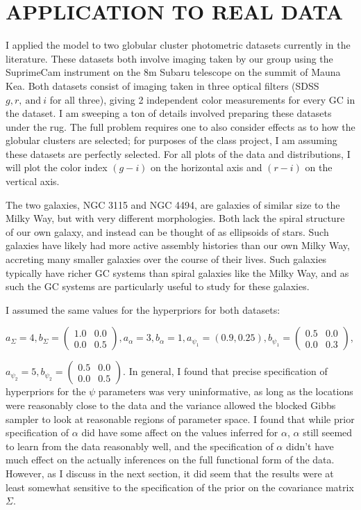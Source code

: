 \documentclass{article}
\begin{document}
\section{APPLICATION TO REAL DATA}
I applied the model to two globular cluster photometric datasets currently in the literature. These datasets both
involve imaging taken by our group using the SuprimeCam instrument on the 8m Subaru telescope on the summit
of Mauna Kea. Both datasets consist of imaging taken in three optical filters
(SDSS $g,r,~\textrm{and}~i$ for all three),
giving 2 independent color measurements for every GC in the dataset. I am sweeping a ton of details
involved preparing these datasets under the rug. The full problem requires one to also consider effects as to how
the globular clusters are selected; for purposes of the class project, I am assuming these datasets are perfectly selected.
For all plots of the data and distributions, I will plot the color index $(g-i)$ on the horizontal axis
and $(r-i)$ on the vertical axis.

The two galaxies, NGC 3115 and NGC 4494, are galaxies of similar size to the Milky Way, but with very different
morphologies. Both lack the spiral structure of our own galaxy, and instead can be thought of as ellipsoids of stars.
Such galaxies have likely had more active assembly histories than our own Milky Way, accreting many smaller galaxies
over the course of their lives. Such galaxies typically have richer GC systems than spiral galaxies like the Milky Way,
and as such the GC systems are particularly useful to study for these galaxies.

I assumed the same values for the hyperpriors for both datasets:

$a_{\Sigma}=4,b_{\Sigma}=\begin{pmatrix} 1.0 & 0.0 \\ 0.0 & 0.5\end{pmatrix},
a_{\alpha}=3,b_{\alpha}=1,a_{\psi_1}=(0.9,0.25),b_{\psi_1}=\begin{pmatrix} 0.5 & 0.0 \\ 0.0 & 0.3\end{pmatrix}$,

$a_{\psi_2}=5,b_{\psi_2} =\begin{pmatrix} 0.5 & 0.0 \\ 0.0 & 0.5\end{pmatrix}.$ In general, I found that precise specification of
hyperpriors for the $\psi$ parameters was very uninformative, as long as the locations were reasonably close
to the data and the variance allowed the blocked Gibbs sampler to look at reasonable regions of parameter space.
I found that while prior specification of $\alpha$ did have some affect on the values inferred for $\alpha$, $\alpha$
still seemed to learn from the data reasonably well, and the specification of $\alpha$ didn't have much effect on the
actually inferences on the full functional form of the data. However, as I discuss in the next section, it did seem
that the results were at least somewhat sensitive to the specification of the prior on the covariance matrix $\Sigma$.
\end{document}
